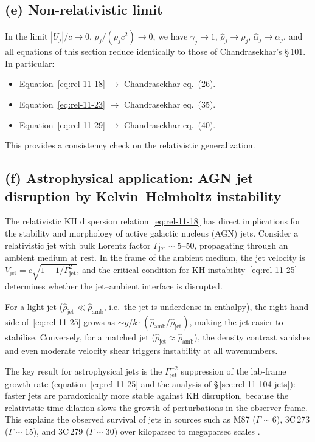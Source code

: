\subsection*{(e) Non-relativistic limit}

In the limit $|U_j|/c \to 0$, $p_j/(\rho_j c^{2}) \to 0$,
we have $\gamma_j \to 1$, $\hat{\rho}_j \to \rho_j$,
$\hat{\alpha}_j \to \alpha_j$, and all equations of this section
reduce identically to those of Chandrasekhar's \S\,101.  In particular:
\begin{itemize}
\item Equation~\eqref{eq:rel-11-18} $\to$ Chandrasekhar eq.~(26).
\item Equation~\eqref{eq:rel-11-23} $\to$ Chandrasekhar eq.~(35).
\item Equation~\eqref{eq:rel-11-29} $\to$ Chandrasekhar eq.~(40).
\end{itemize}
This provides a consistency check on the relativistic generalization.

\subsection*{(f) Astrophysical application: AGN jet disruption by Kelvin--Helmholtz instability}
\label{sec:rel-11-101-app}

The relativistic KH dispersion relation~\eqref{eq:rel-11-18} has
direct implications for the stability and morphology of active galactic
nucleus (AGN) jets.  Consider a relativistic jet with bulk Lorentz factor
$\Gamma_{\mathrm{jet}} \sim 5$--$50$, propagating through an ambient
medium at rest.  In the frame of the ambient medium, the jet velocity is
$V_{\mathrm{jet}} = c\sqrt{1-1/\Gamma_{\mathrm{jet}}^{2}}$, and the
critical condition for KH instability~\eqref{eq:rel-11-25} determines
whether the jet--ambient interface is disrupted.

For a light jet ($\hat{\rho}_{\mathrm{jet}} \ll \hat{\rho}_{\mathrm{amb}}$,
i.e.\ the jet is underdense in enthalpy), the right-hand side
of~\eqref{eq:rel-11-25} grows as $\sim g/k \cdot (\hat{\rho}_{\mathrm{amb}}/\hat{\rho}_{\mathrm{jet}})$,
making the jet easier to stabilise.  Conversely, for a matched jet
($\hat{\rho}_{\mathrm{jet}} \approx \hat{\rho}_{\mathrm{amb}}$), the
density contrast vanishes and even moderate velocity shear triggers
instability at all wavenumbers.

The key result for astrophysical jets is the $\Gamma_{\mathrm{jet}}^{-2}$
suppression of the lab-frame growth rate (equation~\eqref{eq:rel-11-25}
and the analysis of \S\,\ref{sec:rel-11-104-jets}): faster jets are
paradoxically more stable against KH disruption, because the relativistic
time dilation slows the growth of perturbations in the observer frame.
This explains the observed survival of jets in sources such as M87
($\Gamma \sim 6$), 3C\,273 ($\Gamma \sim 15$), and 3C\,279
($\Gamma \sim 30$) over kiloparsec to megaparsec scales
\cite{PeruchoMarti2004, Hardee2007, BodoEtAl2004}.

